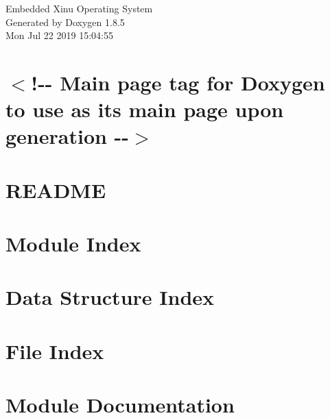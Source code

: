 \documentclass[twoside]{book}
\newcommand{\clearemptydoublepage}{%
  \newpage{\pagestyle{empty}\cleardoublepage}%
}
\begin{document}
\hypersetup{pageanchor=false}
\begin{titlepage}
\vspace*{7cm}
\begin{center}%
{\Large Embedded Xinu Operating System }\\
\vspace*{1cm}
{\large Generated by Doxygen 1.8.5}\\
\vspace*{0.5cm}
{\small Mon Jul 22 2019 15:04:55}\\
\end{center}
\end{titlepage}
\clearemptydoublepage
\tableofcontents
\clearemptydoublepage
{}
\hypersetup{pageanchor=true}

\chapter{$<$!-\/-\/ Main page tag for Doxygen to use as its main page upon generation -\/-\/$>$}
\label{index}\hypertarget{index}{}
\chapter{R\-E\-A\-D\-M\-E}
\label{md_README}
\hypertarget{md_README}{}

\chapter{Module Index}

\chapter{Data Structure Index}

\chapter{File Index}

\chapter{Module Documentation}







































\end{document}
